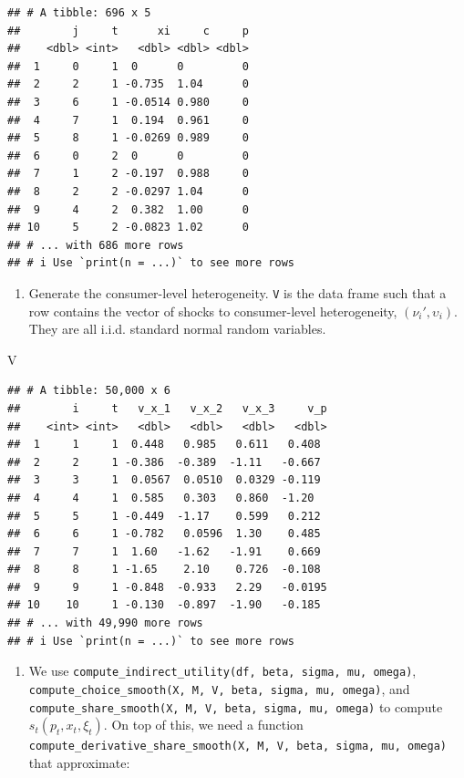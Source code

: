\documentclass[
]{book}
\newenvironment{Shaded}{\begin{snugshade}}{\end{snugshade}}
\newcommand{\NormalTok}[1]{#1}
\providecommand{\tightlist}{%
  \setlength{\itemsep}{0pt}\setlength{\parskip}{0pt}}
\begin{document}
\begin{verbatim}
## # A tibble: 696 x 5
##        j     t      xi     c     p
##    <dbl> <int>   <dbl> <dbl> <dbl>
##  1     0     1  0      0         0
##  2     2     1 -0.735  1.04      0
##  3     6     1 -0.0514 0.980     0
##  4     7     1  0.194  0.961     0
##  5     8     1 -0.0269 0.989     0
##  6     0     2  0      0         0
##  7     1     2 -0.197  0.988     0
##  8     2     2 -0.0297 1.04      0
##  9     4     2  0.382  1.00      0
## 10     5     2 -0.0823 1.02      0
## # ... with 686 more rows
## # i Use `print(n = ...)` to see more rows
\end{verbatim}

\begin{enumerate}
\def\labelenumi{\arabic{enumi}.}
\setcounter{enumi}{3}
\tightlist
\item
  Generate the consumer-level heterogeneity. \texttt{V} is the data frame such that a row contains the vector of shocks to consumer-level heterogeneity, \((\nu_{i}', \upsilon_i)\). They are all i.i.d. standard normal random variables.
\end{enumerate}

\begin{Shaded}
\begin{Highlighting}[]
\NormalTok{V}
\end{Highlighting}
\end{Shaded}

\begin{verbatim}
## # A tibble: 50,000 x 6
##        i     t   v_x_1   v_x_2   v_x_3     v_p
##    <int> <int>   <dbl>   <dbl>   <dbl>   <dbl>
##  1     1     1  0.448   0.985   0.611   0.408 
##  2     2     1 -0.386  -0.389  -1.11   -0.667 
##  3     3     1  0.0567  0.0510  0.0329 -0.119 
##  4     4     1  0.585   0.303   0.860  -1.20  
##  5     5     1 -0.449  -1.17    0.599   0.212 
##  6     6     1 -0.782   0.0596  1.30    0.485 
##  7     7     1  1.60   -1.62   -1.91    0.669 
##  8     8     1 -1.65    2.10    0.726  -0.108 
##  9     9     1 -0.848  -0.933   2.29   -0.0195
## 10    10     1 -0.130  -0.897  -1.90   -0.185 
## # ... with 49,990 more rows
## # i Use `print(n = ...)` to see more rows
\end{verbatim}

\begin{enumerate}
\def\labelenumi{\arabic{enumi}.}
\setcounter{enumi}{4}
\tightlist
\item
  We use \texttt{compute\_indirect\_utility(df,\ beta,\ sigma,\ mu,\ omega)}, \texttt{compute\_choice\_smooth(X,\ M,\ V,\ beta,\ sigma,\ mu,\ omega)}, and \texttt{compute\_share\_smooth(X,\ M,\ V,\ beta,\ sigma,\ mu,\ omega)} to compute \(s_t(p_t, x_t, \xi_t)\). On top of this, we need a function \texttt{compute\_derivative\_share\_smooth(X,\ M,\ V,\ beta,\ sigma,\ mu,\ omega)} that approximate:
\end{enumerate}
\end{document}
